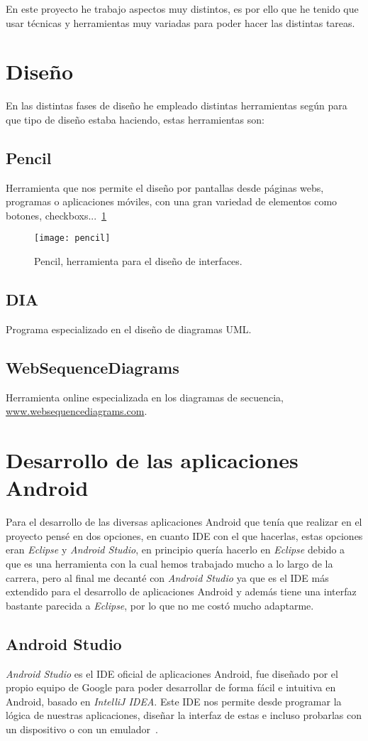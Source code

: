 
En este proyecto he trabajo aspectos muy distintos, es por ello que he tenido que usar técnicas y herramientas muy variadas para poder hacer las distintas tareas.

\section{Diseño}
En las distintas fases de diseño he empleado distintas herramientas según para que tipo de diseño estaba haciendo, estas herramientas son:
\subsection{Pencil}
Herramienta que nos permite el diseño por pantallas desde páginas webs, programas o aplicaciones móviles, con una gran variedad de elementos como botones, checkboxs...~\ref{fig:pencil}

\begin{figure}
	\centering
	\texttt{[image: pencil]}
	\caption{Pencil, herramienta para el diseño de interfaces.}
	\label{fig:pencil}
\end{figure}
\subsection{DIA}Programa especializado en el diseño de diagramas UML.
\subsection{WebSequenceDiagrams}Herramienta online especializada en los diagramas de secuencia, \url{www.websequencediagrams.com}. 
\section{Desarrollo de las aplicaciones Android}
Para el desarrollo de las diversas aplicaciones Android que tenía que realizar en el proyecto pensé en dos opciones, en cuanto IDE con el que hacerlas, estas opciones eran \textit{Eclipse} y \textit{Android Studio}, en principio quería hacerlo en \textit{Eclipse} debido a que es una herramienta con la cual hemos trabajado mucho a lo largo de la carrera, pero al final me decanté con \textit{Android Studio} ya que es el IDE más extendido para el desarrollo de aplicaciones Android y además tiene una interfaz bastante parecida a \textit{Eclipse}, por lo que no me costó mucho adaptarme.
\subsection{Android Studio}
\textit{Android Studio} es el IDE oficial de aplicaciones Android, fue diseñado por el propio equipo de Google para poder desarrollar de forma fácil e intuitiva en Android, basado en \textit{IntelliJ IDEA}. Este IDE nos permite desde programar la lógica de nuestras aplicaciones, diseñar la interfaz de estas e incluso probarlas con un dispositivo o con un emulador~\cite{androidstudio}.

